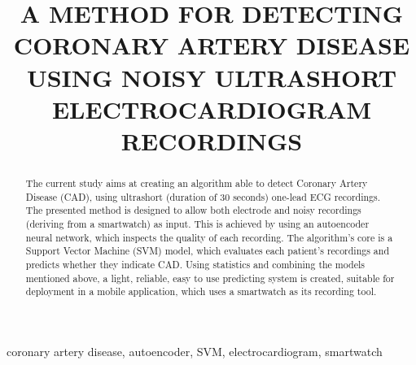 \title{A METHOD FOR DETECTING CORONARY ARTERY DISEASE USING NOISY ULTRASHORT ELECTROCARDIOGRAM RECORDINGS}
%
 \address{$^{\dagger}$Department of Electrical \& Computer Eng., Khalifa University, PO Box 127788, UAE\\
 $^{\star}$ Department of Electrical \& Computer Eng., Aristotle University of Thessaloniki, GR-54124, Greece}
%
%
%

%
\maketitle
%
\begin{abstract}
The current study aims at creating an algorithm able to detect Coronary Artery Disease (CAD), using ultrashort (duration of 30 seconds) one-lead ECG recordings. The presented method is designed to allow both electrode and noisy recordings (deriving from a smartwatch) as input. This is achieved by using an autoencoder neural network, which inspects the quality of each recording. The algorithm's core is a Support Vector Machine (SVM) model, which evaluates each patient's recordings and predicts whether they indicate CAD. Using statistics and combining the models mentioned above, a light, reliable, easy to use predicting system is created, suitable for deployment in a mobile application, which uses a smartwatch as its recording tool.
\end{abstract}
%
\begin{keywords}
coronary artery disease, autoencoder, SVM, electrocardiogram, smartwatch
\end{keywords}
%
